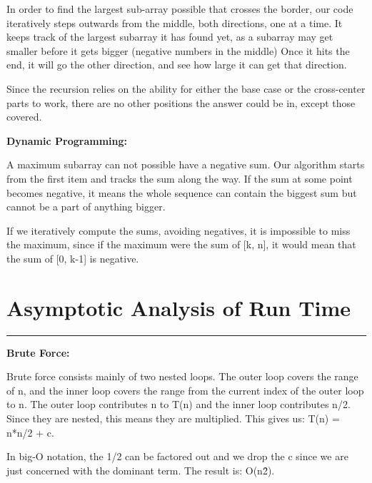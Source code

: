 \documentclass[letterpaper,10pt,titlepage,fleqn]{article}
\begin{document}
In order to find the largest sub-array possible that crosses the border, our code iteratively steps outwards from the middle, both directions, one at a time.  It keeps track of the largest subarray it has found yet, as a subarray may get smaller before it gets bigger (negative numbers in the middle)  Once it hits the end, it will go the other direction, and see how large it can get that direction.

Since the recursion relies on the ability for either the base case or the cross-center parts to work, there are no other positions the answer could be in, except those covered.







\begin{centering}
\textbf{Dynamic Programming:}
\end{centering}


A maximum subarray can not possible have a negative sum. Our algorithm starts from the first item and tracks the sum along the way. If the sum at some point becomes negative, it means the whole sequence can contain the biggest sum but cannot be a part of anything bigger.

If we iteratively compute the sums, avoiding negatives, it is impossible to miss the maximum, since if the maximum were the sum of [k, n], it would mean that the sum of [0, k-1] is negative.

\section*{Asymptotic Analysis of Run Time}
\hrule

\begin{centering}
\textbf{Brute Force:}
\end{centering}


Brute force consists mainly of two nested loops. The outer loop covers the range of n, and the inner loop covers the range from the current index of the outer loop to n. The outer loop contributes n to T(n) and the inner loop contributes n/2. Since they are nested, this means they are multiplied. This gives us: T(n) = n*n/2 + c.

In big-O notation, the 1/2 can be factored out and we drop the c since we are just concerned with the dominant term. The result is: O(n\^2).
\end{document}

